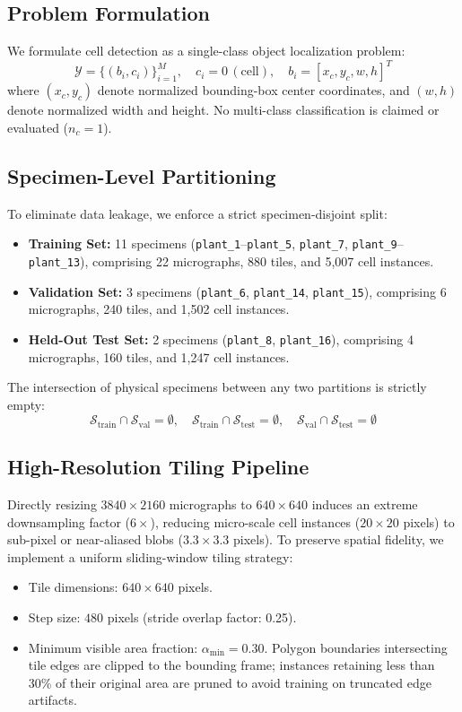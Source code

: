 \documentclass[conference]{IEEEtran}
\begin{document}
\subsection{Problem Formulation}
We formulate cell detection as a single-class object localization problem:
\begin{equation}
\mathcal{Y} = \{(b_i, c_i)\}_{i=1}^{M}, \quad c_i = 0 \, (\text{cell}), \quad b_i = [x_c, y_c, w, h]^T
\end{equation}
where $(x_c, y_c)$ denote normalized bounding-box center coordinates, and $(w, h)$ denote normalized width and height. No multi-class classification is claimed or evaluated ($n_c = 1$).

\subsection{Specimen-Level Partitioning}
To eliminate data leakage, we enforce a strict specimen-disjoint split:
\begin{itemize}
    \item \textbf{Training Set:} 11 specimens (\texttt{plant\_1}--\texttt{plant\_5}, \texttt{plant\_7}, \texttt{plant\_9}--\texttt{plant\_13}), comprising 22 micrographs, 880 tiles, and 5,007 cell instances.
    \item \textbf{Validation Set:} 3 specimens (\texttt{plant\_6}, \texttt{plant\_14}, \texttt{plant\_15}), comprising 6 micrographs, 240 tiles, and 1,502 cell instances.
    \item \textbf{Held-Out Test Set:} 2 specimens (\texttt{plant\_8}, \texttt{plant\_16}), comprising 4 micrographs, 160 tiles, and 1,247 cell instances.
\end{itemize}
The intersection of physical specimens between any two partitions is strictly empty:
\begin{equation}
\mathcal{S}_{\text{train}} \cap \mathcal{S}_{\text{val}} = \emptyset, \quad \mathcal{S}_{\text{train}} \cap \mathcal{S}_{\text{test}} = \emptyset, \quad \mathcal{S}_{\text{val}} \cap \mathcal{S}_{\text{test}} = \emptyset
\end{equation}

\subsection{High-Resolution Tiling Pipeline}
Directly resizing $3840 \times 2160$ micrographs to $640 \times 640$ induces an extreme downsampling factor ($6\times$), reducing micro-scale cell instances ($20 \times 20$ pixels) to sub-pixel or near-aliased blobs ($3.3 \times 3.3$ pixels). To preserve spatial fidelity, we implement a uniform sliding-window tiling strategy:
\begin{itemize}
    \item Tile dimensions: $640 \times 640$ pixels.
    \item Step size: $480$ pixels (stride overlap factor: 0.25).
    \item Minimum visible area fraction: $\alpha_{\text{min}} = 0.30$. Polygon boundaries intersecting tile edges are clipped to the bounding frame; instances retaining less than 30\% of their original area are pruned to avoid training on truncated edge artifacts.
\end{itemize}
\end{document}
